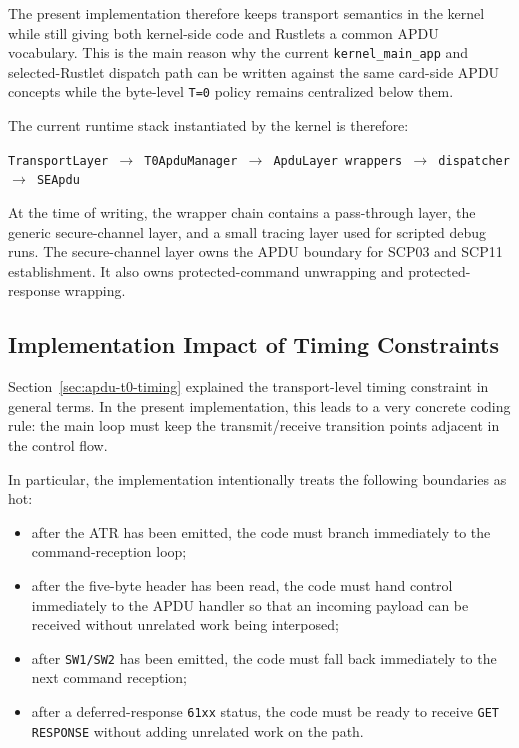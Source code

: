 The present implementation therefore keeps transport semantics in the
kernel while still giving both kernel-side code and Rustlets a common
APDU vocabulary. This is the main reason why the current
\texttt{kernel\_main\_app} and selected-Rustlet dispatch path can be
written against the same card-side APDU concepts while the byte-level
\texttt{T=0} policy remains centralized below them.

The current runtime stack instantiated by the kernel is therefore:
\begin{center}
\texttt{TransportLayer $\rightarrow$ T0ApduManager $\rightarrow$ ApduLayer wrappers $\rightarrow$ dispatcher $\rightarrow$ SEApdu}
\end{center}

At the time of writing, the wrapper chain contains a pass-through layer,
the generic secure-channel layer, and a small tracing layer used for scripted
debug runs. The secure-channel layer owns the APDU boundary for SCP03 and
SCP11 establishment. It also owns protected-command unwrapping and
protected-response wrapping.

\subsection{Implementation Impact of Timing Constraints}

Section~\ref{sec:apdu-t0-timing} explained the transport-level timing
constraint in general terms. In the present implementation, this leads
to a very concrete coding rule: the main loop must keep the
transmit/receive transition points adjacent in the control flow.

In particular, the implementation intentionally treats the following
boundaries as hot:

\begin{itemize}
\item after the ATR has been emitted, the code must branch immediately
  to the command-reception loop;
\item after the five-byte header has been read, the code must hand
  control immediately to the APDU handler so that an incoming payload
  can be received without unrelated work being interposed;
\item after \texttt{SW1/SW2} has been emitted, the code must fall back
  immediately to the next command reception;
\item after a deferred-response \texttt{61xx} status, the code must be
  ready to receive \texttt{GET RESPONSE} without adding unrelated work
  on the path.
\end{itemize}

